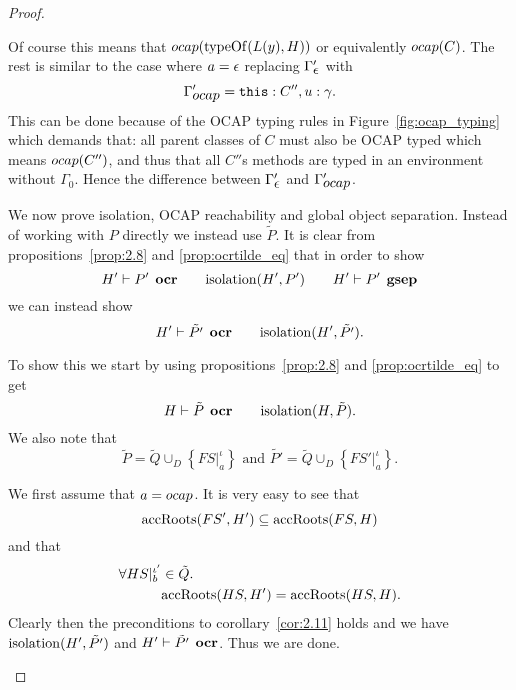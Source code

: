 \begin{proof}
\begin{description}
\begin{description}
          Of course this means that $\mbox{$ocap$}(\mbox{$\mathrm{typeOf}$}(L(y), H))$ or equivalently
          $\mbox{$ocap$}(C)$. The rest is similar to the case where $a = \mbox{$\epsilon$}$
          replacing $\Gamma_{\mbox{$\epsilon$}}'$ with 
          \begin{equation}
            \Gamma'_{\mbox{$ocap$}} = \mbox{\mdseries\texttt{this}}: C'', u: \gamma.
          \end{equation}
          This can be done because of the OCAP typing rules in
          Figure~\ref{fig:ocap_typing} which demands that: all parent classes of
          $C$ must also be OCAP typed which means $\mbox{$ocap$}(C'')$, and thus that
          all $C''$s methods are typed in an environment without $\Gamma_0$.
          Hence the difference between $\Gamma'_{\mbox{$\epsilon$}}$ and $\Gamma'_{\mbox{$ocap$}}$.

          We now prove isolation, OCAP reachability and global object
          separation. Instead of working with $P$ directly we instead use
          $\tilde{P}$. It is clear from propositions~\ref{prop:2.8} and
          \ref{prop:ocrtilde_eq} that in order to show 
          \begin{equation}
            H' \vdash P' \:\: \mbox{\bf ocr} \quad\quad \mbox{$\mathrm{isolation}$}(H', P') \quad\quad H'
            \vdash P' \:\: \mbox{\bf gsep}
          \end{equation}
          we can instead show
          \begin{equation}
            H' \vdash \tilde{P'} \:\: \mbox{\bf ocr} \quad\quad \mbox{$\mathrm{isolation}$}(H', \tilde{P'}).
          \end{equation}

          To show this we start by using propositions~\ref{prop:2.8} and
          \ref{prop:ocrtilde_eq} to get
          \begin{equation}
            H \vdash \tilde{P} \:\: \mbox{\bf ocr} \quad\quad \mbox{$\mathrm{isolation}$}(H, \tilde{P}).
          \end{equation}
          We also note that 
          \begin{equation}
            \tilde{P} = \tilde{Q} \cup_D \left\{ FS|_a^\iota \right\} \text{ and }
            \tilde{P'} = \tilde{Q} \cup_D \left\{ FS'|_a^\iota \right\}.
          \end{equation}

          We first assume that $a = \mbox{$ocap$}$. It is very
          easy to see that
          \begin{equation}
            \mbox{$\mathrm{accRoots}$}(FS', H') \subseteq \mbox{$\mathrm{accRoots}$}(FS, H)
          \end{equation}
          and that
          \begin{equation}
            \begin{aligned}
              \forall HS|_b^{\iota'} &\in \tilde{Q}. \\
              &\mbox{$\mathrm{accRoots}$}(HS, H') = \mbox{$\mathrm{accRoots}$}(HS, H).
            \end{aligned}
          \end{equation}
          Clearly then the preconditions to corollary~\ref{cor:2.11} holds and
          we have $\mbox{$\mathrm{isolation}$}(H', \tilde{P'})$ and $H' \vdash \tilde{P'} \:\:
          \mbox{\bf ocr}$. Thus we are done.


\end{description}
\end{description}
\end{proof}
